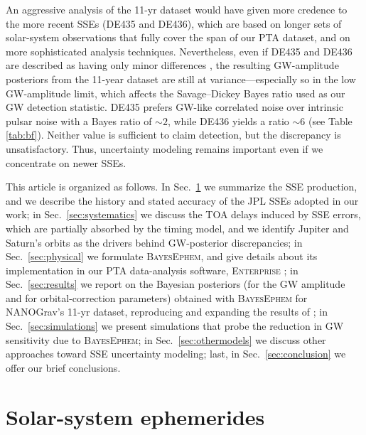 \documentclass[iop,apj,twocolappendix]{emulateapj}
\begin{document}
An aggressive analysis of the 11-yr dataset would have given more credence to the more recent SSEs (DE435 and DE436), which are based on longer sets of solar-system observations that fully cover the span of our PTA dataset, and on more sophisticated analysis techniques.
Nevertheless, even if DE435 and DE436 are described as having only minor differences \citep{de435,de436}, the resulting GW-amplitude posteriors from the 11-year dataset are still at variance---especially so in the low GW-amplitude limit, which affects the Savage--Dickey Bayes ratio used as our GW detection statistic.
DE435 prefers GW-like correlated noise over intrinsic pulsar noise with a Bayes ratio of $\sim 2$, while DE436 yields a ratio $\sim 6$ (see Table \ref{tab:bf}). Neither value is sufficient to claim detection, but the discrepancy is unsatisfactory.
Thus, uncertainty modeling remains important even if we concentrate on newer SSEs.

This article is organized as follows. In Sec.\ \ref{sec:sses} we summarize the SSE production, and we describe the history and stated accuracy of the JPL SSEs adopted in our work; in Sec.\ \ref{sec:systematics} we discuss the TOA delays induced by SSE errors, which are partially absorbed by the timing model, and we identify Jupiter and Saturn's orbits as the drivers behind GW-posterior discrepancies; in Sec.\ \ref{sec:physical} we formulate \textsc{BayesEphem}, and give details about its implementation in our PTA data-analysis software, \textsc{Enterprise} \citep{enterprise}; in Sec.\ \ref{sec:results} we report on the Bayesian posteriors (for the GW amplitude and for orbital-correction parameters) obtained with \textsc{BayesEphem} for NANOGrav's 11-yr dataset, reproducing and expanding the results of \cite{2018ApJ...859...47A};
in Sec.\ \ref{sec:simulations} we present simulations that probe the reduction in GW sensitivity due to \textsc{BayesEphem};
in Sec.\ \ref{sec:othermodels} we discuss other approaches toward SSE uncertainty modeling;
last, in Sec.\ \ref{sec:conclusion} we offer our brief conclusions.  

\section{Solar-system ephemerides}
\label{sec:sses}
\end{document}
